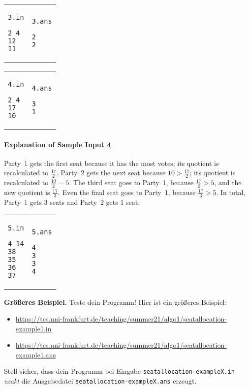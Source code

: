 \documentclass{uebung_cs}
\begin{document}
\begin{tabular}{p{}p{}}
\texttt{3.in}
\begin{verbatim}
2 4
12
11
\end{verbatim}
&
\texttt{3.ans}
\begin{verbatim}
2
2
\end{verbatim}
\end{tabular}

\begin{tabular}{p{}p{}}
\texttt{4.in}
\begin{verbatim}
2 4
17
10
\end{verbatim}
&
\texttt{4.ans}
\begin{verbatim}
3
1
\end{verbatim}
\end{tabular}

\paragraph{Explanation of Sample Input 4}
Party~1 gets the first seat because it has the most votes; its quotient is recalculated to $\frac{17}{2}$.
Party~2 gets the next seat because $10>\frac{17}{2}$; its quotient is recalculated to $\frac{10}{2}=5$.
The third seat goes to Party~1, because $\frac{17}{2}>5$, and the new quotient is $\frac{17}{3}$.
Even the final seat goes to Party~1, because $\frac{17}{3}>5$.
In total, Party~1 gets 3 seats and Party~2 gets 1 seat.

\begin{tabular}{p{}p{}}
\texttt{5.in}
\begin{verbatim}
4 14
38
35
36
37
\end{verbatim}
&
\texttt{5.ans}
\begin{verbatim}
4
3
3
4
\end{verbatim}
\end{tabular}

\textbf{Größeres Beispiel.}
Teste dein Programm! Hier ist ein größeres Beispiel:
\begin{itemize}[noitemsep]
\item \url{https://tcs.uni-frankfurt.de/teaching/summer21/algo1/seatallocation-example1.in}
\item \url{https://tcs.uni-frankfurt.de/teaching/summer21/algo1/seatallocation-example1.ans}
\end{itemize}
Stell sicher, dass dein Programm bei Eingabe \texttt{seatallocation-exampleX.in} \emph{exakt} die Ausgabedatei \texttt{seatallocation-exampleX.ans} erzeugt.
\end{document}

